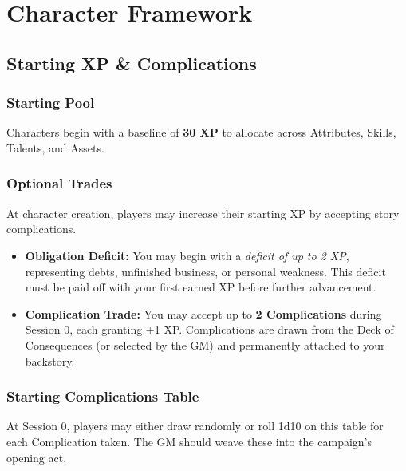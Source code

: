 \documentclass[12pt]{book}
\begin{document}
\part{Character Framework}

\chapter{Starting XP \& Complications}

\section{Starting Pool}
Characters begin with a baseline of \textbf{30 XP} to allocate across Attributes, Skills, Talents, and Assets.

\section{Optional Trades}
At character creation, players may increase their starting XP by accepting story complications.  

\begin{itemize}
  \item \textbf{Obligation Deficit:} You may begin with a \emph{deficit of up to 2 XP}, representing debts, unfinished business, or personal weakness. This deficit must be paid off with your first earned XP before further advancement.  
  \item \textbf{Complication Trade:} You may accept up to \textbf{2 Complications} during Session 0, each granting +1 XP. Complications are drawn from the Deck of Consequences (or selected by the GM) and permanently attached to your backstory.  
\end{itemize}

\section{Starting Complications Table}
At Session 0, players may either draw randomly or roll 1d10 on this table for each Complication taken. The GM should weave these into the campaign’s opening act.
\end{document}
